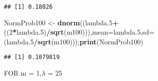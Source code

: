 \documentclass[
]{article}
\newenvironment{Shaded}{\begin{snugshade}}{\end{snugshade}}
\newcommand{\DataTypeTok}[1]{\textcolor[rgb]{0.13,0.29,0.53}{#1}}
\newcommand{\DecValTok}[1]{\textcolor[rgb]{0.00,0.00,0.81}{#1}}
\newcommand{\FloatTok}[1]{\textcolor[rgb]{0.00,0.00,0.81}{#1}}
\newcommand{\KeywordTok}[1]{\textcolor[rgb]{0.13,0.29,0.53}{\textbf{#1}}}
\newcommand{\NormalTok}[1]{#1}
\newcommand{\OperatorTok}[1]{\textcolor[rgb]{0.81,0.36,0.00}{\textbf{#1}}}
\newcommand{\StringTok}[1]{\textcolor[rgb]{0.31,0.60,0.02}{#1}}
\begin{document}
\begin{verbatim}
## [1] 0.18026
\end{verbatim}

\begin{Shaded}
\begin{Highlighting}[]
\NormalTok{NormProb100 <-}\StringTok{ }\KeywordTok{dnorm}\NormalTok{((lambda}\FloatTok{.5}\OperatorTok{+}\NormalTok{((}\DecValTok{2}\OperatorTok{*}\NormalTok{lambda}\FloatTok{.5}\NormalTok{)}\OperatorTok{/}\KeywordTok{sqrt}\NormalTok{(m100))),}\DataTypeTok{mean=}\NormalTok{lambda}\FloatTok{.5}\NormalTok{,}\DataTypeTok{sd=}\NormalTok{(lambda}\FloatTok{.5}\OperatorTok{/}\KeywordTok{sqrt}\NormalTok{(m100)));}\KeywordTok{print}\NormalTok{(NormProb100)}
\end{Highlighting}
\end{Shaded}

\begin{verbatim}
## [1] 0.1079819
\end{verbatim}

FOR m = 1,\(\lambda\) = 25
\end{document}
